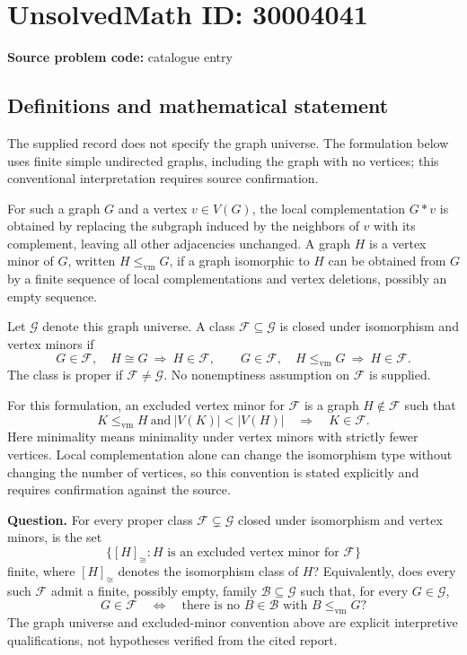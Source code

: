 \documentclass[11pt]{article}
\begin{document}
\section*{UnsolvedMath ID: 30004041}
\textbf{Source problem code:} catalogue entry
\subsection{Definitions and mathematical statement}
The supplied record does not specify the graph universe. The formulation below uses finite simple undirected graphs, including the graph with no vertices; this conventional interpretation requires source confirmation.

For such a graph \(G\) and a vertex \(v\in V(G)\), the local complementation \(G*v\) is obtained by replacing the subgraph induced by the neighbors of \(v\) with its complement, leaving all other adjacencies unchanged. A graph \(H\) is a vertex minor of \(G\), written \(H\leq_{\mathrm{vm}}G\), if a graph isomorphic to \(H\) can be obtained from \(G\) by a finite sequence of local complementations and vertex deletions, possibly an empty sequence.

Let \(\mathcal G\) denote this graph universe. A class \(\mathcal F\subseteq\mathcal G\) is closed under isomorphism and vertex minors if
\[
G\in\mathcal F,\quad H\cong G\ \Longrightarrow\ H\in\mathcal F,
\qquad
G\in\mathcal F,\quad H\leq_{\mathrm{vm}}G\ \Longrightarrow\ H\in\mathcal F.
\]
The class is proper if \(\mathcal F\neq\mathcal G\). No nonemptiness assumption on \(\mathcal F\) is supplied.

For this formulation, an excluded vertex minor for \(\mathcal F\) is a graph \(H\notin\mathcal F\) such that
\[
K\leq_{\mathrm{vm}}H\ \text{and}\ |V(K)|<|V(H)|
\quad\Longrightarrow\quad K\in\mathcal F.
\]
Here minimality means minimality under vertex minors with strictly fewer vertices. Local complementation alone can change the isomorphism type without changing the number of vertices, so this convention is stated explicitly and requires confirmation against the source.

\textbf{Question.} For every proper class \(\mathcal F\subsetneq\mathcal G\) closed under isomorphism and vertex minors, is the set
\[
\bigl\{[H]_{\cong}: H\text{ is an excluded vertex minor for }\mathcal F\bigr\}
\]
finite, where \([H]_{\cong}\) denotes the isomorphism class of \(H\)? Equivalently, does every such \(\mathcal F\) admit a finite, possibly empty, family \(\mathcal B\subseteq\mathcal G\) such that, for every \(G\in\mathcal G\),
\[
G\in\mathcal F
\quad\Longleftrightarrow\quad
\text{there is no }B\in\mathcal B\text{ with }B\leq_{\mathrm{vm}}G?
\]
The graph universe and excluded-minor convention above are explicit interpretive qualifications, not hypotheses verified from the cited report.
\end{document}
